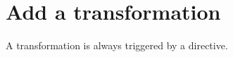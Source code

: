 \documentclass[a4paper, 11pt]{report}
\newcommand{\emptypage}{}
\begin{document}
\section{Add a transformation}
A transformation is always triggered by a directive. 

\pagebreak
\glsaddall
\printglossaries

\emptypage
\pagebreak
\listoffigures

\pagebreak
\listoftables

\emptypage
\pagebreak
\lstlistoflistings

%

%
\end{document}
